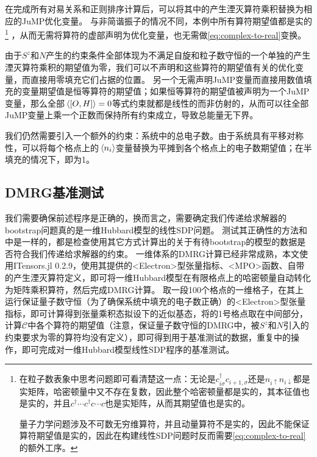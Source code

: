 \documentclass[oneside]{fduthesis}
\def\texttt#1{<#1>}%
\begin{document}
在完成所有对易关系和正则排序计算后，可以将其中的产生湮灭算符乘积替换为相应的JuMP优化变量。
与非简谐振子的情况不同，本例中所有算符期望值都是实的%
\footnote{
    在粒子数表象中思考问题即可看清楚这一点：无论是$c^\dagger_{i \sigma} c_{i + 1, \sigma}$还是$n_{i \uparrow} n_{i \downarrow}$都是实矩阵，哈密顿量中又不存在复数，因此整个哈密顿量都是实的，其本征值也是实的，并且$c^\dagger \cdots c^\dagger c \cdots c$也是实矩阵，从而其期望值也是实的。

    量子力学问题涉及不可数无穷维算符，并且动量算符不是实的，因此不能保证算符期望值是实的，因此在构建线性SDP问题时反而需要\eqref{eq:complex-to-real}的额外工序。
}%
，从而无需将算符的虚部声明为优化变量，也无需做\eqref{eq:complex-to-real}变换。

由于$S^z$和$N$产生的约束条件全部体现为不满足自旋和粒子数守恒的一个单独的产生湮灭算符乘积的期望值为零，我们可以不声明和这些算符的期望值有关的优化变量，而直接用零填充它们占据的位置。
另一个无需声明JuMP变量而直接用数值填充的变量期望值是恒等算符的期望值；如果恒等算符的期望值被声明为一个JuMP变量，那么全部$\expval*{\comm{O}{H}} = 0$等式约束就都是线性的而非仿射的，从而可以往全部JuMP变量上乘一个正数而保持所有约束成立，导致总能量无下界。

我们仍然需要引入一个额外的约束：系统中的总电子数。由于系统具有平移对称性，可以将每个格点上的$\expval*{n_i}$变量替换为平摊到各个格点上的电子数期望值；在半填充的情况下，即为1。

\subsection{DMRG基准测试}

我们需要确保前述程序是正确的，换而言之，需要确定我们传递给求解器的bootstrap问题真的是一维Hubbard模型的线性SDP问题。
测试其正确性的方法和中是一样的，都是检查使用其它方式计算出的关于有待bootstrap的模型的数据是否符合我们传递给求解器的约束。
一维体系的DMRG计算已经非常成熟，本文使用ITensors.jl 0.2.9\cite{itensor,itensor-lib}，使用其提供的\texttt{Electron}型张量指标、\texttt{MPO}函数、自带的产生湮灭算符定义，即可将一维Hubbard模型在有限格点上的哈密顿量自动转化为矩阵乘积算符，然后完成DMRG计算。
取一段100个格点的一维格子，在其上运行保证量子数守恒（为了确保系统中填充的电子数正确）的\texttt{Electron}型张量指标，即可计算得到张量乘积态拟设下的近似基态，将的1号格点取在中间部分，计算$\mathcal{C}$中各个算符的期望值（注意，保证量子数守恒的DMRG中，被$S^z$和$N$引入的约束要求为零的算符均没有定义），即可得到用于基准测试的数据，重复中的操作，即可完成对一维Hubbard模型线性SDP程序的基准测试。
\end{document}

